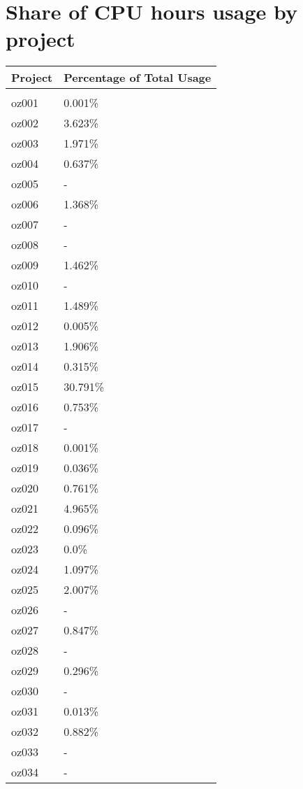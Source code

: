 \documentclass{article}%
\begin{document}
\section{Share of CPU hours usage by project}%

%
\begin{longtabu}{X[l] X[r]}%
\textbf{Project}&\textbf{Percentage of Total Usage}\\%
\hline%
&\\%
oz001&0.001\%\\%
\hline%
oz002&3.623\%\\%
\hline%
oz003&1.971\%\\%
\hline%
oz004&0.637\%\\%
\hline%
oz005&{-}\\%
\hline%
oz006&1.368\%\\%
\hline%
oz007&{-}\\%
\hline%
oz008&{-}\\%
\hline%
oz009&1.462\%\\%
\hline%
oz010&{-}\\%
\hline%
oz011&1.489\%\\%
\hline%
oz012&0.005\%\\%
\hline%
oz013&1.906\%\\%
\hline%
oz014&0.315\%\\%
\hline%
oz015&30.791\%\\%
\hline%
oz016&0.753\%\\%
\hline%
oz017&{-}\\%
\hline%
oz018&0.001\%\\%
\hline%
oz019&0.036\%\\%
\hline%
oz020&0.761\%\\%
\hline%
oz021&4.965\%\\%
\hline%
oz022&0.096\%\\%
\hline%
oz023&0.0\%\\%
\hline%
oz024&1.097\%\\%
\hline%
oz025&2.007\%\\%
\hline%
oz026&{-}\\%
\hline%
oz027&0.847\%\\%
\hline%
oz028&{-}\\%
\hline%
oz029&0.296\%\\%
\hline%
oz030&{-}\\%
\hline%
oz031&0.013\%\\%
\hline%
oz032&0.882\%\\%
\hline%
oz033&{-}\\%
\hline%
oz034&{-}\\%

\end{longtabu}
\end{document}
